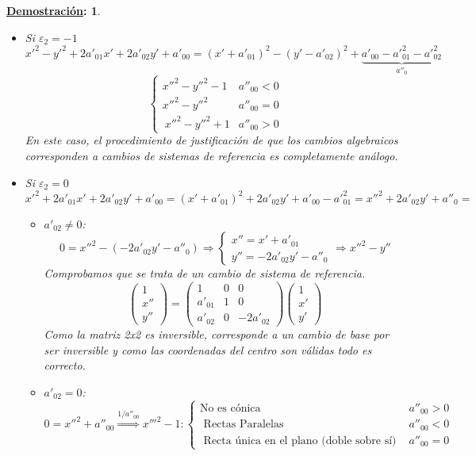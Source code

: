 \documentclass[10pt,a4paper,openright]{book}
\theoremstyle{break}
\newtheorem*{demo}{\underline{Demostración}:}
\begin{document}
\begin{demo}
\begin{itemize}
\item Si $\varepsilon_2 = -1$
$$x'^2 - y'^2 + 2 a'_{01} x' + 2  a'_{02}y' + a'_{00} = (x' + a'_{01} )^2 - (y' - a'_{02})^2 + \underbrace{a'_{00} - a'^2_{01} - a'^2_{02}}_{a''_0} $$
$$\begin{cases} x''^2 - y''^2 - 1 & a''_{00} < 0 \\ x''^2 - y''^2 & a''_{00} = 0 \\ \ x''^2 - y''^2 + 1 & a''_{00} > 0 \end{cases}$$
En este caso, el procedimiento de justificación de que los cambios algebraicos corresponden a cambios de sistemas de referencia es completamente análogo.

\item Si $\varepsilon_2 = 0$
$$x'^2 + 2 a'_{01} x' + 2  a'_{02}y' + a'_{00} = (x' + a'_{01} )^2 + 2  a'_{02}y'  + a'_{00}- a'^2_{01} = x''^2 + 2  a'_{02}y'  + a''_0 = $$
	\begin{itemize}
	\item $ a'_{02} \neq 0$:
	$$ 0 = x''^2 - (-2  a'_{02}y'  - a''_0)  \Rightarrow \begin{cases}
x'' = x' + a'_{01} \\ y'' = -2  a'_{02}y'  - a''_0
\end{cases} \Rightarrow x''^2 - y'' $$
Comprobamos que se trata de un cambio de sistema de referencia.
$$\begin{pmatrix}
1 \\ x'' \\ y''
\end{pmatrix} =
\left(\begin{array}{c|cc}
1 & 0 & 0 \\
\hline
a'_{01} & 1  & 0  \\
a'_{02} &  0 & - 2 a'_{02}
\end{array}
\right)
\begin{pmatrix}
1 \\ x' \\ y'
\end{pmatrix}$$
Como la matriz 2x2 es inversible, corresponde a un cambio de base por ser inversible y como las coordenadas del centro son válidas todo es correcto.

 	\item $a'_{02} = 0$:
 	$$0 = x''^2 + a''_{00} \stackrel{1/a''_{00}}{\Rightarrow} x'''^2 - 1 : \begin{cases} \mbox{No es cónica} & a''_{00} > 0 \\
\mbox{ Rectas Paralelas } & a''_{00} < 0 \\
\mbox{ Recta única en el plano (doble sobre sí) } &a''_{00} = 0\end{cases}$$
	\end{itemize}
\end{itemize}
\end{demo}
\end{document}
